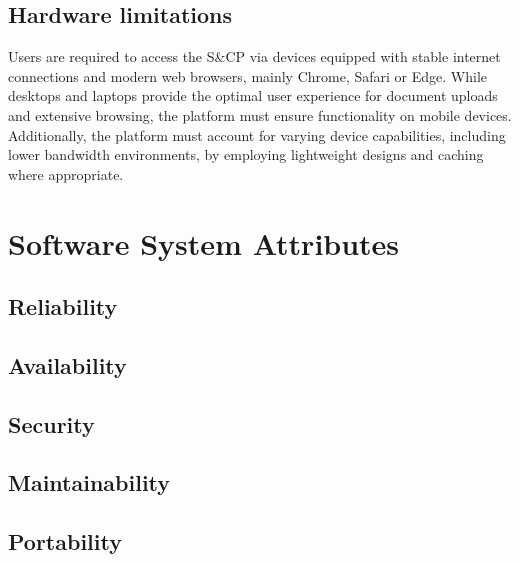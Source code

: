 \subsection{Hardware limitations}
Users are required to access the S\&CP via devices equipped with stable internet connections and modern web browsers, mainly Chrome, Safari or Edge.
While desktops and laptops provide the optimal user experience for document uploads and extensive browsing, the platform must ensure functionality on mobile devices.
Additionally, the platform must account for varying device capabilities, including lower bandwidth environments, by employing lightweight designs and caching where appropriate.

\section{Software System Attributes}
\subsection{Reliability}
\subsection{Availability}
\subsection{Security}
\subsection{Maintainability}
\subsection{Portability}
